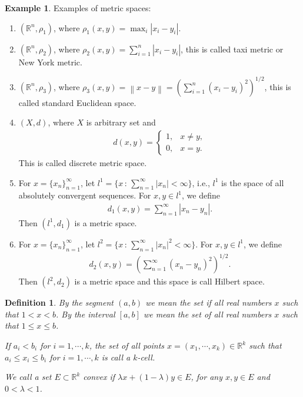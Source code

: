 \documentclass[11pt]{book}
\newtheorem{definition}{Definition}[chapter]
\theoremstyle{definition}
\newtheorem{example}{Example}[chapter]
\numberwithin{equation}{chapter}
\begin{document}
\begin{example}
Examples of metric spaces:
\begin{enumerate}[label=(\alph*)]
    \item $(\mathbb{R}^n,\rho_1)$, where $\rho_1(x,y) = \max_i \left|x_i - y_i\right|$.
    
    \item $(\mathbb{R}^n,\rho_2)$, where $\rho_2(x,y) = \sum^n_{i=1} |x_i-y_i|$, this is called taxi metric or New York metric. 
    
    \item $(\mathbb{R}^n,\rho_3)$, where $\rho_3(x,y) = \left\|x - y\right\| = \left(\sum^n_{i=1} (x_i - y_i)^2 \right)^{1/2}$, this is called standard Euclidean space.
    
    
    \item $(X,d)$, where $X$ is arbitrary set and 
    \begin{align*}
        d(x,y) = \begin{cases}
            1, & x \neq y, \\
            0, & x = y.
        \end{cases}
    \end{align*} 
    This is called discrete metric space.
    
    \item For $x = \{x_n\}^\infty_{n=1}$, let $l^1 = \{x \,:\, \sum^\infty_{n=1}\left|x_n\right| < \infty\}$, i.e., $l^1$ is the space of all absolutely convergent sequences. For $x, y \in l^1$, we define 
    \begin{align*}
        d_1(x,y) = \sum^\infty_{n=1} \left|x_n - y_n\right|.
    \end{align*}
    Then $(l^1,d_1)$ is a metric space.
    
    \item For $x = \{x_n\}^\infty_{n=1}$, let $l^2 = \{x  \,:\, \sum^\infty_{n=1}\left|x_n\right|^2 < \infty\}$. For $x, y \in l^1$, we define
    \begin{align*}
        d_2(x,y) = \left(\sum^\infty_{n=1} (x_n - y_n)^2\right)^{1/2}.
    \end{align*}
    Then $(l^2, d_2)$ is a metric space and this space is call Hilbert space.
\end{enumerate}
\end{example} 

\medskip

\begin{definition}
By the segment $(a,b)$ we mean the set if all real numbers $x$ such that $1 < x < b$. By the interval $[a,b]$ we mean the set of all real numbers $x$ such that $1 \leq x \leq b$. 

If $a_i < b_i$ for $i = 1, \cdots, k$, the set of all points $x = (x_1, \cdots, x_k) \in \mathbb{R}^k$ such that $a_i \leq x_i \leq b_i$ for $i = 1, \cdots, k$ is call a $k$-cell. 

We call a set $E \subset \mathbb{R}^k$ convex if $\lambda x + (1 - \lambda)y \in E$, for any $x,y \in E$ and $0 < \lambda < 1$.
\end{definition}
\end{document}
